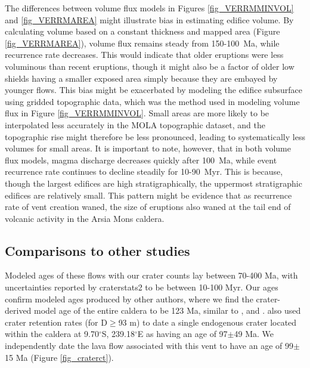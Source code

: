 The differences between volume flux models in Figures \ref{fig_VERRMMINVOL} and \ref{fig_VERRMAREA} might illustrate bias in estimating edifice volume. By calculating volume based on a constant thickness and mapped area (Figure \ref{fig_VERRMAREA}), volume flux remains steady from 150-100~Ma, while recurrence rate decreases. This would indicate that older eruptions were less voluminous than recent eruptions, though it might also be a factor of older low shields having a smaller exposed area simply because they are embayed by younger flows. This bias might be exacerbated by modeling the edifice subsurface using gridded topographic data, which was the method used in modeling volume flux in Figure \ref{fig_VERRMMINVOL}. Small areas are more likely to be interpolated less accurately in the MOLA topographic dataset, and the topographic rise might therefore be less pronounced, leading to systematically less volumes for small areas. It is important to note, however, that in both volume flux models, magma discharge decreases quickly after 100~Ma, while event recurrence rate continues to decline steadily for 10-90~Myr. This is because, though the largest edifices are high stratigraphically, the uppermost stratigraphic edifices are relatively small. This pattern might be evidence that as recurrence rate of vent creation waned, the size of eruptions also waned at the tail end of volcanic activity in the Arsia Mons caldera.

\subsection{Comparisons to other studies}

Modeled ages of these flows with our crater counts lay between 70-400 Ma, with uncertainties reported by craterstats2 to be between 10-100 Myr. Our ages confirm modeled ages produced by other authors, where we find the crater-derived model age of the entire caldera to be 123 Ma, similar to \citet{neukum2004recent}, \citet{werner2009global} and \citep{robbins2011volcanic}. \citet{robbins2011volcanic} also used crater retention rates (for D$\ge$93 m) to date a single endogenous crater located within the caldera at 9.70$^{\circ}$S, 239.18$^{\circ}$E as having an age of 97$\pm$49 Ma. We independently date the lava flow associated with this vent to have an age of 99$\pm$15 Ma (Figure \ref{fig_craterct}).


